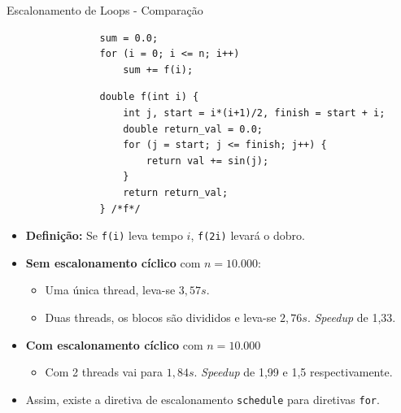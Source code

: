 	\begin{frame}[fragile]{Escalonamento de Loops - Comparação}
		\begin{multicols}{2}
			\begin{verbatim}
				sum = 0.0;
				for (i = 0; i <= n; i++) 
					sum += f(i);
			\end{verbatim}
		\columnbreak
					\pause
			\begin{verbatim}
				double f(int i) {
					int j, start = i*(i+1)/2, finish = start + i;
					double return_val = 0.0;
					for (j = start; j <= finish; j++) {
						return val += sin(j);
					}
					return return_val; 
				} /*f*/
			\end{verbatim}
		\end{multicols}


		\begin{itemize}
			\setlength\itemsep{0.3em}
			\item \textbf{Definição:} Se {\tt f(i)} leva tempo $i$, {\tt f(2i)} levará o dobro.
					\pause
			\item \textbf{Sem escalonamento cíclico} com $n=10.000$:
			\begin{itemize}
				\item Uma única thread, leva-se $3,57s$.
				\item Duas threads, os blocos são divididos e leva-se $2,76s$. \textit{Speedup}  de 1,33.
			\end{itemize}
					\pause
			\item \textbf{Com escalonamento cíclico} com $n=10.000$
			\begin{itemize}
				\item Com 2 threads vai para $1,84s$. \textit{Speedup} de 1,99 e 1,5 respectivamente.
			\end{itemize}
			\item Assim, existe a diretiva de escalonamento {\tt schedule} para diretivas {\tt for}.
		\end{itemize}
\end{frame}

